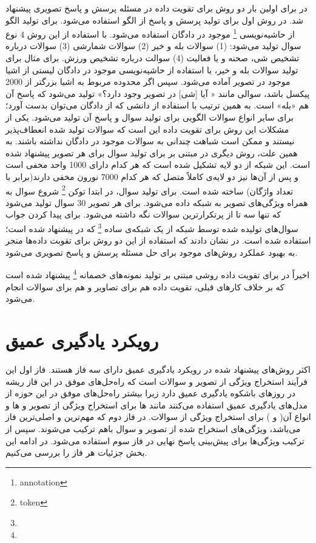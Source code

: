   در
  \cite{kafle2017data}
 برای اولین بار دو روش برای تقویت داده در مسئله پرسش و پاسخ تصویری پیشنهاد شد.  در روش اول برای تولید پرسش و پاسخ از الگو استفاده‌ می‌شود. برای تولید الگو از حاشیه‌نویسی 
 \footnote{annotation}
 موجود در ‌دادگان استفاده‌ می‌شود. با استفاده از این روش 4 نوع سوال تولید می‌شود: (1) سوالات بله و خیر (2) سوالات شمارشی (3) سوالات درباره تشخیص شی، صحنه و یا فعالیت (4) سوالت درباره تشخیص ورزش. برای مثال برای تولید سوالات بله و خیر، با استفاده از حاشیه‌نویسی موجود در دادگان لیستی از اشیا موجود در تصویر آماده می‌شود. سپس اگر محدوده مربوط به اشیا بزرگتر از 2000 پیکسل باشد، سوالی مانند « آیا [شی] در تصویر وجود دارد؟» تولید می‌شود که پاسخ آن هم «بله» است. به همین ترتیب با استفاده از دانشی که از ‌دادگان می‌توان بدست آورد؛ برای سایر انواع سوالات الگویی برای تولید سوال و پاسخ آن تولید می‌شود. یکی از مشکلات این روش برای تقویت داده این است که سوالات تولید شده انعطاف‌‌پذیر نیستند و ممکن است شباهت چندانی به سوالات موجود در ‌دادگان نداشته باشند. به همین علت، روش دیگری در 
 \cite{kafle2017data}
 مبتنی بر 
 برای تولید سوال برای هر تصویر پیشنهاد شده است. این شبکه از دو لایه 
 تشکیل شده است که هر کدام دارای 1000 واحد مخفی است و پس از آن‌ها نیز دو لایه‌ی کاملاً متصل که هر کدام 7000 نورون مخفی دارند(برابر با تعداد واژگان) ساخته شده است. برای تولید سوال، در ابتدا توکن 
 \footnote{token}
 شروع سوال به همراه ویژگی‌های تصویر به شبکه داده‌ می‌شود. برای هر تصویر 30 سوال تولید می‌شود که تنها سه تا از پرتکرارترین سوالات  نگه داشته می‌شود. برای پیدا کردن جواب سوال‌های تولیده شده توسط شبکه 
 از یک شبکه‌ی ساده
 \footnote{}
 که در 
 \cite{kafle2016answer}
  پیشنهاد شده است؛ استفاده شده است. در 
 \cite{kafle2017data}
  نشان دادند که استفاده از این دو روش برای تقوبت داده‌ها منجر به بهبود عملکرد روش‌های موجود برای حل مسئله پرسش و پاسخ تصویری می‌شود. 
  
  اخیراً در
 \cite{tang2020semantic}
 برای تقویت داده روشی مبتنی بر تولید نمونه‌های خصمانه
 \footnote{}
 پیشنهاد شده است که بر خلاف کارهای قبلی، تقویت داده هم برای تصاویر و هم برای سوالات انجام می‌شود.
 
 
\section{رویکرد یادگیری عمیق}
اکثر روش‌های پیشنهاد شده در رویکرد یادگیری عمیق دارای سه فاز هستند. فاز اول این فرآیند استخراج ویژگی از تصویر و سوالات است که راه‌حل‌های موفق در این فاز ریشه در روزهای باشکوه یادگیری عمیق دارد زیرا بیشتر راه‌حل‌های موفق در این حوزه از مدل‌های یادگیری عمیق استفاده می‌کنند مانند 
 ها برای استخراج ویژگی از  تصویر و 
  ها و انواع آن(
  و
  ) برای استخراج ویژگی از سوالات. در فاز دوم که مهم‌ترین و اصلی‌ترین فاز می‌باشد، ویژگی‌های استخراج شده از تصویر و سوال باهم ترکیب می‌شوند. سپس از ترکیب ویژگی‌ها برای پیش‌بینی پاسخ نهایی در فاز سوم استفاده می‌شود. در ادامه این بخش جزئیات هر فاز را بررسی می‌کنیم.
